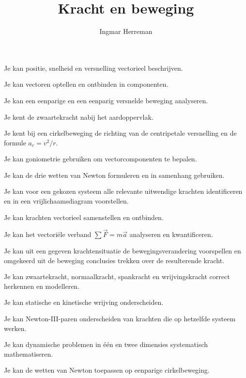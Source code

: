 \documentclass{ximera}
\title{Kracht en beweging}
\author{Ingmar Herreman}
\begin{document}





\maketitle


\begin{voorkennis}
  \item Je kan positie, snelheid en versnelling vectorieel beschrijven.
  \item Je kan vectoren optellen en ontbinden in componenten.
  \item Je kan een eenparige en een eenparig versnelde beweging analyseren.
  \item Je kent de zwaartekracht nabij het aardoppervlak.
  \item Je kent bij een cirkelbeweging de richting van de centripetale
        versnelling en de formule $a_c=v^2/r$.
  \item Je kan goniometrie gebruiken om vectorcomponenten te bepalen.
\end{voorkennis}

\begin{leerdoelen}
  \item Je kan de drie wetten van Newton formuleren en in samenhang gebruiken.
  \item Je kan voor een gekozen systeem alle relevante uitwendige krachten
        identificeren en in een vrijlichaamsdiagram voorstellen.
  \item Je kan krachten vectorieel samenstellen en ontbinden.
  \item Je kan het vectoriële verband
        $\sum\vec F=m\vec a$ analyseren en kwantificeren.
  \item Je kan uit een gegeven krachtensituatie de bewegingsverandering
        voorspellen en omgekeerd uit de beweging conclusies trekken over
        de resulterende kracht.
  \item Je kan zwaartekracht, normaalkracht, spankracht en wrijvingskracht
        correct herkennen en modelleren.
  \item Je kan statische en kinetische wrijving onderscheiden.
  \item Je kan Newton-III-paren onderscheiden van krachten die op hetzelfde
        systeem werken.
  \item Je kan dynamische problemen in één en twee dimensies systematisch
        mathematiseren.
  \item Je kan de wetten van Newton toepassen op eenparige cirkelbeweging.
\end{leerdoelen}
\end{document}
